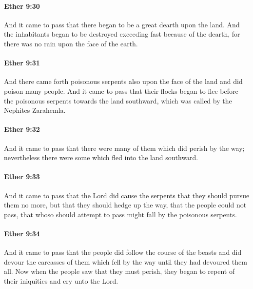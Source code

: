 		\paragraph{Ether 9:30} %
			\label{ETHER-9-30}

			And it came to pass that there began to be a great dearth upon the land.
			And the inhabitants began to be destroyed exceeding fast because of the dearth,
			for there was no rain upon the face of the earth.

		\paragraph{Ether 9:31} %
			\label{ETHER-9-31}

			And there came forth poisonous serpents also upon the face of the land
			and did poison many people.
			And it came to pass that their flocks began to flee before the poisonous serpents
			towards the land southward, which was called by the Nephites Zarahemla.

		\paragraph{Ether 9:32} %
			\label{ETHER-9-32}

			And it came to pass that there were many of them which did perish by the way;
			nevertheless there were some which fled into the land southward.

		\paragraph{Ether 9:33} %
			\label{ETHER-9-33}

			And it came to pass that the Lord did cause the serpents
			that they should pursue them no more,
			but that they should hedge up the way,
			that the people could not pass,
			that whoso should attempt to pass might fall by the poisonous serpents.

		\paragraph{Ether 9:34} %
			\label{ETHER-9-34}

			And it came to pass that the people did follow the course of the beasts
			and did devour the carcasses of them which fell by the way
			until they had devoured them all.
			Now when the people saw that they must perish,
			they began to repent of their iniquities and cry unto the Lord.

